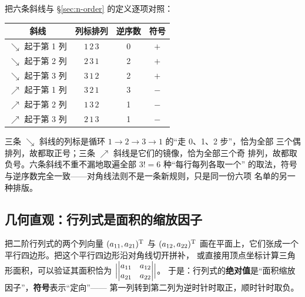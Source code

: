 \begin{insight}[本质：对角线法则 = 排列定义的一种排版]
把六条斜线与 \S\ref{sec:n-order} 的定义逐项对照：
\begin{center}
\renewcommand{\arraystretch}{1.2}
\begin{tabular}{c|c|c|c}
\hline
斜线 & 列标排列 & 逆序数 & 符号 \\
\hline
$\searrow$ 起于第 1 列 & $1\,2\,3$ & 0 & $+$ \\
$\searrow$ 起于第 2 列 & $2\,3\,1$ & 2 & $+$ \\
$\searrow$ 起于第 3 列 & $3\,1\,2$ & 2 & $+$ \\
$\nearrow$ 起于第 1 列 & $3\,2\,1$ & 3 & $-$ \\
$\nearrow$ 起于第 2 列 & $1\,3\,2$ & 1 & $-$ \\
$\nearrow$ 起于第 3 列 & $2\,1\,3$ & 1 & $-$ \\
\hline
\end{tabular}
\end{center}
三条 $\searrow$ 斜线的列标是循环 $1\to2\to3\to1$ 的“走 0、1、2 步”，恰为全部
三个偶排列，故都取正号；三条 $\nearrow$ 斜线是它们的镜像，恰为全部三个奇
排列，故都取负号。六条斜线不重不漏地取遍全部 $3!=6$ 种“每行每列各取一个”
的取法，符号与逆序数完全一致——对角线法则不是一条新规则，只是同一份六项
名单的另一种排版。
\end{insight}

\subsection{几何直观：行列式是面积的缩放因子}

把二阶行列式的两个列向量 $(a_{11},a_{21})^{\mathrm{T}}$ 与 $(a_{12},a_{22})^{\mathrm{T}}$
画在平面上，它们张成一个平行四边形。把这个平行四边形沿对角线切开拼补，
或直接用顶点坐标计算三角形面积，可以验证其面积恰为
$\Bigl|\begin{vmatrix} a_{11} & a_{12} \\ a_{21} & a_{22} \end{vmatrix}\Bigr|$。
于是：行列式的\textbf{绝对值}是“面积缩放因子”，\textbf{符号}表示“定向”——
第一列转到第二列为逆时针时取正，顺时针时取负。

